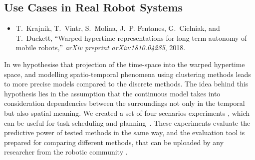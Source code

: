 \subsection{Use Cases in Real Robot Systems}

\begin{itemize}
    \item T.~Krajnik, T.~Vintr, S.~Molina, J.~P. Fentanes, G.~Cielniak, and T.~Duckett, ``Warped hypertime representations for long-term autonomy of mobile robots,'' \emph{arXiv preprint arXiv:1810.04285}, 2018.
\end{itemize}

In \cite{krajnik2018warped} we hypothesise that projection of the time-space into the warped hypertime space, and modelling spatio-temporal phenomena using clustering methods leads to more precise models compared to the discrete methods.
The idea behind this hypothesis lies in the assumption that the continuous model takes into consideration dependencies between
 the surroundings not only in the temporal \cite{tipaldi2013lifelong,rosen2016towards,kucner2013conditional,krajnik2017fremen} but also spatial meaning.
We created a set of four scenarios experiments \cite{krajnik2017towards}, which can be useful for task scheduling and planning~\cite{mudrova2015integrated}.
These experiments evaluate the predictive power of tested methods in the same way, and the evaluation tool is prepared for
 comparing different methods, that can be uploaded by any researcher from the robotic community \cite{krajnik2017towards}.

